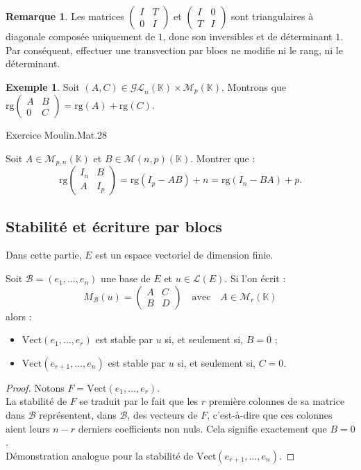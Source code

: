 \documentclass[french]{article}
\newcommand{\K}{\mathbb{K}}
\newcommand{\Vect}{\text{Vect}}
\newcommand{\rg}{\text{rg}}
\theoremstyle{plain}
\theoremstyle{definition}
\newtheorem*{ex}{Exemple}
\newtheorem*{rmq}{Remarque}
\theoremstyle{remark}
\begin{document}
\begin{rmq}
	Les matrices $\begin{pmatrix}
		I&T\\
		0&I
	\end{pmatrix}$ et $\begin{pmatrix}
	I&0\\
	T&I
	\end{pmatrix}$ sont triangulaires à diagonale composée uniquement de $1$, donc son inversibles et de déterminant $1$. Par conséquent, effectuer une transvection par blocs ne modifie ni le rang, ni le déterminant.
\end{rmq}

\begin{ex}
	Soit $(A,C)\in\mathcal{GL}_n(\K)\times\mathcal{M}_p(\K)$. Montrons que $\rg\begin{pmatrix}
		A&B\\
		0&C
	\end{pmatrix}=\rg(A)+\rg(C)$.
\end{ex}

Exercice Moulin.Mat.28

\begin{exo}
	Soit $A\in\mathcal{M}_{p,n}(\K)$ et $B\in\mathcal{M}(n,p)(\K)$. Montrer que :
	$$\rg\begin{pmatrix}
		I_n&B\\
		A&I_p
	\end{pmatrix}=\rg(I_p-AB)+n=\rg(I_n-BA)+p.$$
\end{exo}

\subsection{Stabilité et écriture par blocs}

Dans cette partie, $E$ est un espace vectoriel de dimension finie.

\begin{prop}%
	Soit $\mathcal{B}=(e_1,\ldots,e_n)$ une base de $E$ et $u\in\mathcal{L}(E)$. Si l'on écrit :
	$$M_\mathcal{B}(u)=\begin{pmatrix}
		A&C\\
		B&D
	\end{pmatrix}\quad\text{avec}\quad A\in\mathcal{M}_r(\K)$$
	alors :
	\begin{itemize}
		\item $\Vect(e_1,\ldots,e_r)$ est stable par $u$ si, et seulement si, $B=0$ ;
		\item $\Vect(e_{r+1},\ldots,e_n)$ est stable par $u$ si, et seulement si, $C=0$.
	\end{itemize}
\end{prop}
\begin{proof}
	Notons $F=\Vect(e_1,\ldots,e_r)$.\\
	La stabilité de $F$ se traduit par le fait que les $r$ première colonnes de sa matrice dans $\mathcal{B}$ représentent, dans $\mathcal{B}$, des vecteurs de $F$, c'est-à-dire  que ces colonnes aient leurs $n-r$ derniers coefficients non nuls. Cela signifie exactement que $B=0$. \\
	Démonstration analogue pour la stabilité de $\Vect(e_{r+1},\ldots,e_n)$.
\end{proof}
\end{document}
